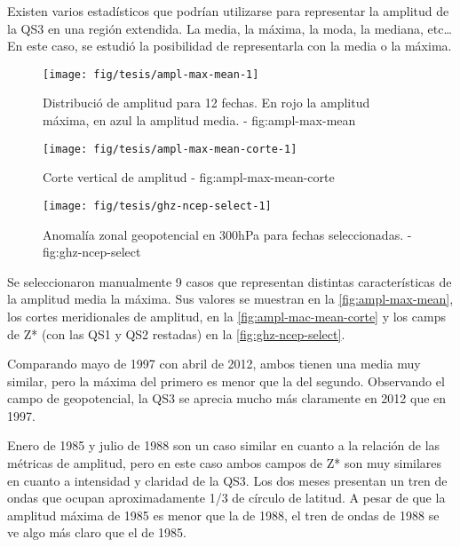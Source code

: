 \documentclass[spanish,a4paper]{book}
\begin{document}
Existen varios estadísticos que podrían utilizarse para representar la
amplitud de la QS3 en una región extendida. La media, la máxima, la
moda, la mediana, etc\ldots{} En este caso, se estudió la posibilidad de
representarla con la media o la
máxima.


\begin{figure*}
\texttt{[image: fig/tesis/ampl-max-mean-1]} \caption{Distribució de amplitud para 12 fechas. En rojo la amplitud máxima, en azul la amplitud media. - fig:ampl-max-mean}\label{fig:ampl-max-mean}
\end{figure*}

\begin{figure*}
\texttt{[image: fig/tesis/ampl-max-mean-corte-1]} \caption{Corte vertical de amplitud - fig:ampl-max-mean-corte}\label{fig:ampl-max-mean-corte}
\end{figure*}

\begin{figure*}
\texttt{[image: fig/tesis/ghz-ncep-select-1]} \caption{Anomalía zonal geopotencial en 300hPa para fechas seleccionadas. - fig:ghz-ncep-select}\label{fig:ghz-ncep-select}
\end{figure*}

Se seleccionaron manualmente 9 casos que representan distintas
características de la amplitud media la máxima. Sus valores se muestran
en la \autoref{fig:ampl-max-mean}, los cortes meridionales de amplitud,
en la \autoref{fig:ampl-mac-mean-corte} y los camps de Z* (con las QS1 y
QS2 restadas) en la \autoref{fig:ghz-ncep-select}.

Comparando mayo de 1997 con abril de 2012, ambos tienen una media muy
similar, pero la máxima del primero es menor que la del segundo.
Observando el campo de geopotencial, la QS3 se aprecia mucho más
claramente en 2012 que en 1997.

Enero de 1985 y julio de 1988 son un caso similar en cuanto a la
relación de las métricas de amplitud, pero en este
caso ambos campos de Z* son muy similares en cuanto
a intensidad y claridad de la QS3. Los dos meses presentan un tren de
ondas que ocupan aproximadamente 1/3 de círculo de latitud. A pesar de
que la amplitud máxima de 1985 es menor que la de 1988, el tren de ondas
de 1988 se ve algo más claro que el de 1985.
\end{document}
